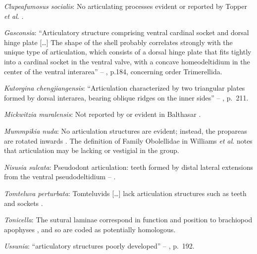 \documentclass[openany]{book}
\theoremstyle{definition}
\theoremstyle{definition}
\theoremstyle{definition}
\theoremstyle{remark}
\begin{document}
\hypertarget{Clupeafumosus_socialis-coding-59}{}
\emph{Clupeafumosus socialis}: No articulating processes evident or
reported by Topper \emph{et al}. \citeyearpar{Topper2013Reappraisalof}.

\hypertarget{Gasconsia-coding-59}{}
\emph{Gasconsia}: ``Articulatory structure comprising ventral cardinal
socket and dorsal hinge plate {[}\ldots{}{]} The shape of the shell
probably correlates strongly with the unique type of articulation, which
consists of a dorsal hinge plate that fits tightly into a cardinal
socket in the ventral valve, with a concave homeodeltidium in the center
of the ventral interarea'' --
\citet{Williams2000LinguliformeaCraniiformea}, p.184, concerning order
Trimerellida.

\hypertarget{Kutorgina_chengjiangensis-coding-59}{}
\emph{Kutorgina chengjiangensis}: ``Articulation characterized by two
triangular plates formed by dorsal interarea, bearing oblique ridges on
the inner sides'' -- \citet{Williams2000LinguliformeaCraniiformea},
p.~211.

\hypertarget{Mickwitzia_muralensis-coding-59}{}
\emph{Mickwitzia muralensis}: Not reported by or evident in Balthasar
\citeyearpar{Balthasar2004Shellstructure}.

\hypertarget{Mummpikia_nuda-coding-59}{}
\emph{Mummpikia nuda}: No articulation structures are evident; instead,
the propareas are rotated inwards \citep{Balthasar2008iMummpikia}. The
definition of Family Obolellidae in Williams \emph{et al}.
\citeyearpar{Williams2000LinguliformeaCraniiformea} notes that
articulation may be lacking or vestigial in the group.

\hypertarget{Nisusia_sulcata-coding-59}{}
\emph{Nisusia sulcata}: Pseudodont articulation: teeth formed by distal
lateral extensions from the ventral pseudodeltidium --
\citet{Holmer2018Evolutionarysignificance}.

\hypertarget{Tomteluva_perturbata-coding-59}{}
\emph{Tomteluva perturbata}: Tomteluvids {[}\ldots{}{]} lack
articulation structures such as teeth and sockets
\citep{Streng2016Anew}.

\hypertarget{Tonicella-coding-59}{}
\emph{Tonicella}: The sutural laminae correspond in function and
position to brachiopod apophyses \citep{Connors2012}, and so are coded
as potentially homologous.

\hypertarget{Ussunia-coding-59}{}
\emph{Ussunia}: ``articulatory structures poorly developed'' --
\citet{Williams2000LinguliformeaCraniiformea}, p.~192.
\end{document}
